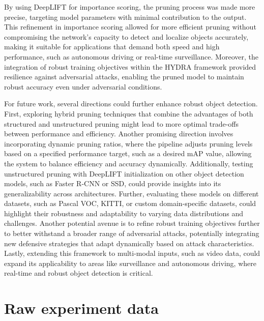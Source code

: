 \documentclass[journal,onecolumn,12pt]{IEEEtran}
\begin{document}
By using DeepLIFT for importance scoring, the pruning process was made more precise, targeting model parameters with minimal contribution to the output. This refinement in importance scoring allowed for more efficient pruning without compromising the network's capacity to detect and localize objects accurately, making it suitable for applications that demand both speed and high performance, such as autonomous driving or real-time surveillance. Moreover, the integration of robust training objectives within the HYDRA framework provided resilience against adversarial attacks, enabling the pruned model to maintain robust accuracy even under adversarial conditions.

For future work, several directions could further enhance robust object detection. First, exploring hybrid pruning techniques that combine the advantages of both structured and unstructured pruning might lead to more optimal trade-offs between performance and efficiency. Another promising direction involves incorporating dynamic pruning ratios, where the pipeline adjusts pruning levels based on a specified performance target, such as a desired mAP value, allowing the system to balance efficiency and accuracy dynamically. Additionally, testing unstructured pruning with DeepLIFT initialization on other object detection models, such as Faster R-CNN or SSD, could provide insights into its generalizability across architectures. Further, evaluating these models on different datasets, such as Pascal VOC, KITTI, or custom domain-specific datasets, could highlight their robustness and adaptability to varying data distributions and challenges. Another potential avenue is to refine robust training objectives further to better withstand a broader range of adversarial attacks, potentially integrating new defensive strategies that adapt dynamically based on attack characteristics. Lastly, extending this framework to multi-modal inputs, such as video data, could expand its applicability to areas like surveillance and autonomous driving, where real-time and robust object detection is critical.


\printbibliography
\newpage

\appendices
\section{Raw experiment data}
\label{appendix:tables}
\end{document}
